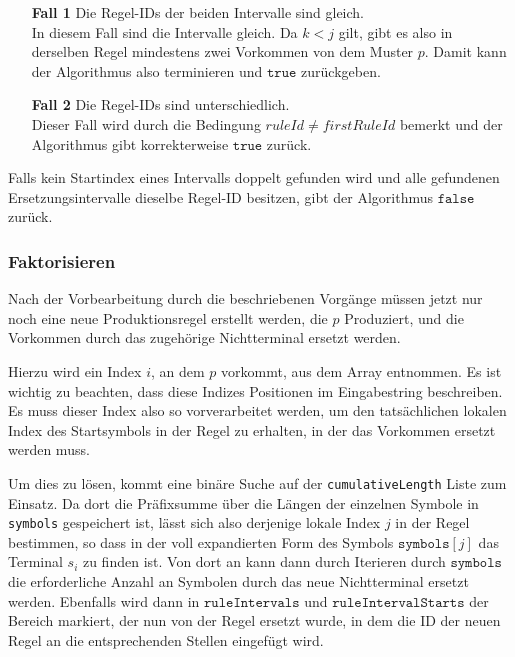 \begin{enumerate}
	\item[\textbf{Fall 1}] Die Regel-IDs der beiden Intervalle sind gleich.\\
	In diesem Fall sind die Intervalle gleich. Da $k < j$ gilt, gibt es also in derselben Regel mindestens zwei Vorkommen von dem Muster $p$. Damit kann der Algorithmus also terminieren und $\texttt{true}$ zurückgeben.
	\item[\textbf{Fall 2}] Die Regel-IDs sind unterschiedlich.\\
	Dieser Fall wird durch die Bedingung $ruleId \neq firstRuleId$ bemerkt und der Algorithmus gibt korrekterweise $\texttt{true}$ zurück.
\end{enumerate}

Falls kein Startindex eines Intervalls doppelt gefunden wird und alle gefundenen Ersetzungsintervalle dieselbe Regel-ID besitzen, gibt der Algorithmus $\texttt{false}$ zurück.

\subsubsection{Faktorisieren}

Nach der Vorbearbeitung durch die beschriebenen Vorgänge müssen jetzt nur noch eine neue Produktionsregel erstellt werden, die $p$ Produziert, und die Vorkommen durch das zugehörige Nichtterminal ersetzt werden.

Hierzu wird ein Index $i$, an dem $p$ vorkommt, aus dem Array entnommen. Es ist wichtig zu beachten, dass diese Indizes Positionen im Eingabestring beschreiben. Es muss dieser Index also so vorverarbeitet werden, um den tatsächlichen lokalen Index des Startsymbols in der Regel zu erhalten, in der das Vorkommen ersetzt werden muss.

Um dies zu lösen, kommt eine binäre Suche auf der \texttt{cumulativeLength} Liste zum Einsatz. Da dort die Präfixsumme über die Längen der einzelnen Symbole in \texttt{symbols} gespeichert ist, 
lässt sich also derjenige lokale Index $j$ in der Regel bestimmen, so dass in der voll expandierten Form des Symbols $\texttt{symbols}[j]$ das Terminal $s_{i}$ zu finden ist.
Von dort an kann dann durch Iterieren durch $\texttt{symbols}$ die erforderliche Anzahl an Symbolen durch das neue Nichtterminal ersetzt werden.
Ebenfalls wird dann in $\texttt{ruleIntervals}$ und $\texttt{ruleIntervalStarts}$ der Bereich markiert, der nun von der Regel ersetzt wurde, in dem die ID der neuen Regel an die entsprechenden Stellen eingefügt wird.

